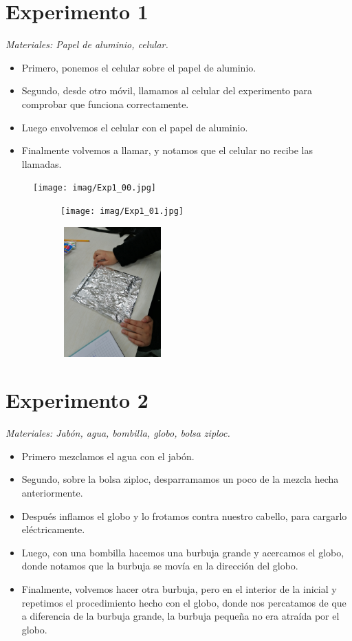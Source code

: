 \documentclass[a4paper,12pt]{article}
\begin{document}
\section*{Experimento 1}
\textit{Materiales: Papel de aluminio, celular.}
\begin{itemize}
    \item Primero, ponemos el celular sobre el papel de aluminio.
    \item Segundo, desde otro móvil, llamamos al celular del experimento para comprobar que funciona correctamente.
    \item Luego envolvemos el celular con el papel de aluminio.
    \item Finalmente volvemos a llamar, y notamos que el celular no recibe las llamadas.
\end{itemize}
\begin{figure}[h]
    \begin{subfigure}
        \raggedright
        \texttt{[image: imag/Exp1\_00.jpg]}
        \end{subfigure}
    \begin{subfigure}
        \centering
        \texttt{[image: imag/Exp1\_01.jpg]}
    \end{subfigure}
    \begin{subfigure}
        \raggedleft
        \includegraphics[width=4cm, height=5cm]{imag/Exp1_02.jpg}
    \end{subfigure}
\end{figure}

\section*{Experimento 2}
\textit{Materiales: Jabón, agua, bombilla, globo, bolsa ziploc.}
\begin{itemize}
    \item Primero mezclamos el agua con el jabón.
    \item Segundo, sobre la bolsa ziploc, desparramamos un poco de la mezcla hecha anteriormente.
    \item Después inflamos el globo y lo frotamos contra nuestro cabello, para cargarlo eléctricamente.
    \item Luego, con una bombilla hacemos una burbuja grande y acercamos el globo, donde notamos que la burbuja se movía en la dirección del globo.
    \item Finalmente, volvemos hacer otra burbuja, pero en el interior de la inicial y repetimos el procedimiento hecho con el globo, donde nos percatamos de que a diferencia
    de la burbuja grande, la burbuja pequeña no era atraída por el globo.
\end{itemize}
\end{document}
